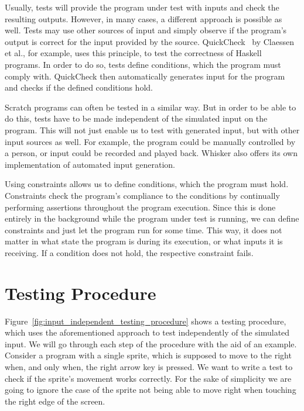 Usually, tests will provide the program under test with inputs and check the resulting outputs.
However, in many cases, a different approach is possible as well.
Tests may use other sources of input and simply observe if the program's output is correct for the input provided by the source.
QuickCheck~\cite{quickcheck} by Claessen et al., for example, uses this principle, to test the correctness of Haskell programs.
In order to do so, tests define conditions, which the program must comply with.
QuickCheck then automatically generates input for the program and checks if the defined conditions hold.
\parspace

Scratch programs can often be tested in a similar way.
But in order to be able to do this, tests have to be made independent of the simulated input on the program.
This will not just enable us to test with generated input, but with other input sources as well.
For example, the program could be manually controlled by a person, or input could be recorded and played back.
Whisker also offers its own implementation of automated input generation.
\parspace

Using constraints allows us to define conditions, which the program must hold.
Constraints check the program's compliance to the conditions by continually performing assertions throughout the program execution.
Since this is done entirely in the background while the program under test is running, we can define constraints and just let the program run for some time.
This way, it does not matter in what state the program is during its execution, or what inputs it is receiving.
If a condition does not hold, the respective constraint fails.

\section{Testing Procedure}
\label{sec:constraint_testing_procedure}

Figure~\ref{fig:input_independent_testing_procedure} shows a testing procedure, which uses the aforementioned approach to test independently of the simulated input.
We will go through each step of the procedure with the aid of an example.
Consider a program with a single sprite, which is supposed to move to the right when, and only when, the right arrow key is pressed.
We want to write a test to check if the sprite's movement works correctly.
For the sake of simplicity we are going to ignore the case of the sprite not being able to move right when touching the right edge of the screen.

